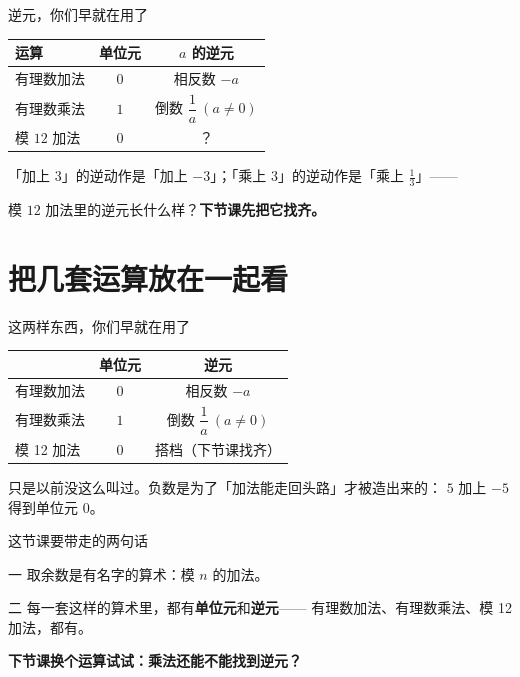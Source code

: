 \documentclass[10pt]{beamer}
\begin{document}
\begin{frame}{逆元，你们早就在用了}
  \begin{center}
  \begin{tabular}{@{}lcc@{}}
    \toprule
    运算 & 单位元 & \(a\) 的逆元 \\
    \midrule
    有理数加法 & \(0\) & 相反数 \(-a\) \\
    有理数乘法 & \(1\) & 倒数 \(\dfrac{1}{a}\ (a\neq 0)\) \\
    模 \(12\) 加法 & \(0\) & ？ \\
    \bottomrule
  \end{tabular}
  \end{center}
  \pause
  「加上 \(3\)」的逆动作是「加上 \(-3\)」；「乘上 \(3\)」的逆动作是「乘上 \(\frac{1}{3}\)」——
  \pause
  \begin{center}
    {\large 模 \(12\) 加法里的逆元长什么样？\textbf{下节课先把它找齐。}}
  \end{center}
\end{frame}

\section{把几套运算放在一起看}

\begin{frame}{这两样东西，你们早就在用了}
  \begin{center}
  \begin{tabular}{@{}lcc@{}}
    \toprule
     & \textbf{单位元} & \textbf{逆元} \\
    \midrule
    有理数加法 & \(0\) & 相反数 \(-a\) \\
    有理数乘法 & \(1\) & 倒数 \(\dfrac{1}{a}\ (a\neq 0)\) \\
    模 12 加法 & \(0\) & 搭档（下节课找齐） \\
    \bottomrule
  \end{tabular}
  \end{center}
  \pause
  \begin{att}
    只是以前没这么叫过。\pause 负数是为了「加法能走回头路」才被造出来的：
    \(5\) 加上 \(-5\) 得到单位元 \(0\)。
  \end{att}
\end{frame}

\begin{frame}{这节课要带走的两句话}
  \begin{block}{一}
    取余数是有名字的算术：模 \(n\) 的加法。
  \end{block}
  \begin{block}{二}
    每一套这样的算术里，都有\textbf{单位元}和\textbf{逆元}——
    有理数加法、有理数乘法、模 12 加法，都有。
  \end{block}
  \pause
  \begin{center}
    {\large\textcolor{textgreen}{\bfseries 下节课换个运算试试：乘法还能不能找到逆元？}}
  \end{center}
\end{frame}
\end{document}
